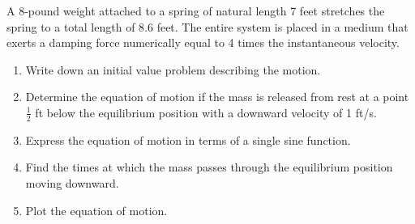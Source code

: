 \begin{Exercise}[title={Mixed Spring Mass and Electrical Network Systems}]
	\Question\label{3-6-4}
	A 8-pound weight attached to a spring of natural length 7 feet stretches the spring to a total length of 8.6 feet.  The entire system is placed in a medium that exerts a damping force numerically equal to 4 times the instantaneous velocity.
	
	\begin{enumerate}[label =\textbf{\roman*.}, noitemsep]
		\item Write down an initial value problem describing the motion.
		\item Determine the equation of motion if the mass is released from rest at a point  $\tfrac{1}{2}$ ft below the equilibrium position with a downward velocity of 1 ft/s.
		\item Express the  equation of motion in terms of a single sine function.
		\item Find the times at which the mass passes through the equilibrium position moving downward.
		\item Plot the equation of motion.
	\end{enumerate}
	\medskip


\end{Exercise}
